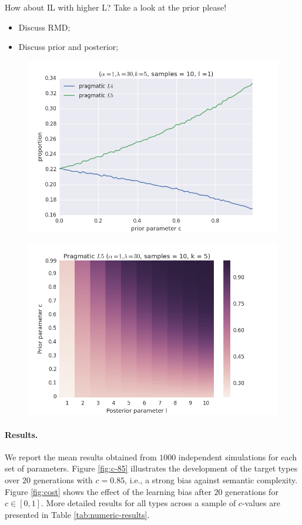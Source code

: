 \documentclass[a4paper]{article}
\newcommand{\hl}[1]{\textcolor[rgb]{.8,.33,.0}{#1}}%
\begin{document}
\hl{How about IL with higher L? Take a look at the prior please!}

\begin{itemize}
  \item Discuss RMD;
  \item Discuss prior and posterior;
\end{itemize}

\begin{figure}
\centering
\includegraphics[scale=.5]{../presentations/03cost-with-l1}
\end{figure}


\begin{figure}
\centering
\includegraphics[scale=.5]{../presentations/01heatmap}
\end{figure}

\paragraph{Results.} We report the mean results obtained from $1000$ independent simulations for each set of parameters. Figure \ref{fig:c-85} illustrates the development of the target types over $20$ generations with $c = 0.85$, i.e., a strong bias against semantic complexity. Figure \ref{fig:cost} shows the effect of the learning bias after $20$ generations for $c \in [0,1]$. More detailed results for all types across a sample of $c$-values are presented in Table \ref{tab:numeric-results}.
\end{document}
